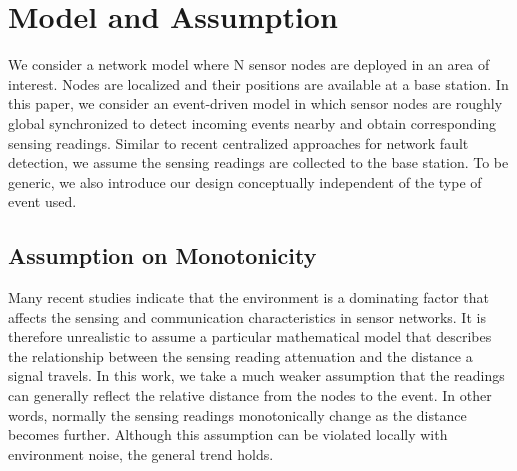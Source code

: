 \section{Model and Assumption}
We consider a network model where N sensor nodes are deployed in an area of interest. Nodes are localized and their positions are available at a base station. In this paper, we consider an event-driven model in which sensor nodes are roughly global synchronized to detect incoming events nearby and obtain corresponding sensing readings. Similar to recent centralized approaches for network fault detection, we assume the sensing readings are collected to the base station. To be generic, we also introduce our design conceptually independent of the type of event used.
\subsection{Assumption on Monotonicity}
Many recent studies indicate that the environment is a dominating factor that affects the sensing and communication characteristics in sensor networks. It is therefore unrealistic to assume a particular mathematical model that describes the relationship between the sensing reading attenuation and the distance a signal travels. In this work, we take a much weaker assumption that the readings can generally reflect the relative distance from the nodes to the event. In other words, normally the sensing readings monotonically change as the distance becomes further. Although this assumption can be violated locally with environment noise, the general trend holds.